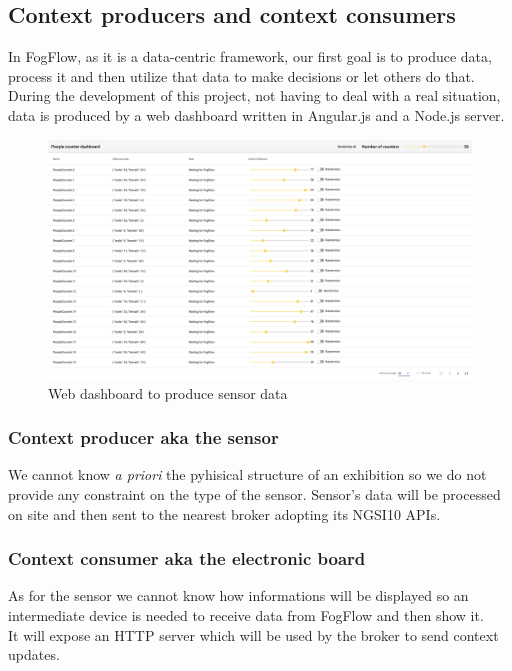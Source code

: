 \documentclass[a4paper]{article}
\begin{document}
\subsection{Context producers and context consumers}
In FogFlow, as it is a data-centric framework, our first goal is to produce data, process it and then utilize that data to make decisions or let others do that.\\
During the development of this project, not having to deal with a real situation, data is produced by a web dashboard written in Angular.js and a Node.js server.

\begin{figure}[H]
    \centering
    \includegraphics[width=\textwidth]{Images/web_dashboard.png}
    \caption{Web dashboard to produce sensor data}
\end{figure}{}

\subsubsection{Context producer aka the sensor}
We cannot know \textit{a priori} the pyhisical structure of an exhibition so we do not provide any constraint on the type of the sensor.
Sensor's data will be processed on site and then sent to the nearest broker adopting its NGSI10 APIs.

\subsubsection{Context consumer aka the electronic board}
As for the sensor we cannot know how informations will be displayed so an intermediate device is needed to receive data from FogFlow and then show it.\\
It will expose an HTTP server which will be used by the broker to send context updates.
\end{document}
